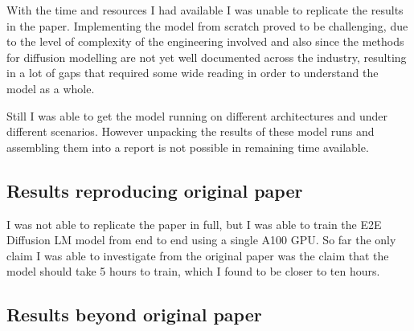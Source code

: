 
With the time and resources I had available I was unable to replicate the results in the paper. Implementing the model from scratch proved to be challenging, due to the level of complexity of the engineering involved and also since the methods for diffusion modelling are not yet well documented across the industry, resulting in a lot of gaps that required some wide reading in order to understand the model as a whole.

Still I was able to get the model running on different architectures and under different scenarios. However unpacking the results of these model runs and assembling them into a report is not possible in remaining time available.

\subsection{Results reproducing original paper}

I was not able to replicate the paper in full, but I was able to train the E2E Diffusion LM model from end to end using a single A100 GPU. So far the only claim I was able to investigate from the original paper was the claim that the model should take 5 hours to train, which I found to be closer to ten hours.




\subsection{Results beyond original paper}


